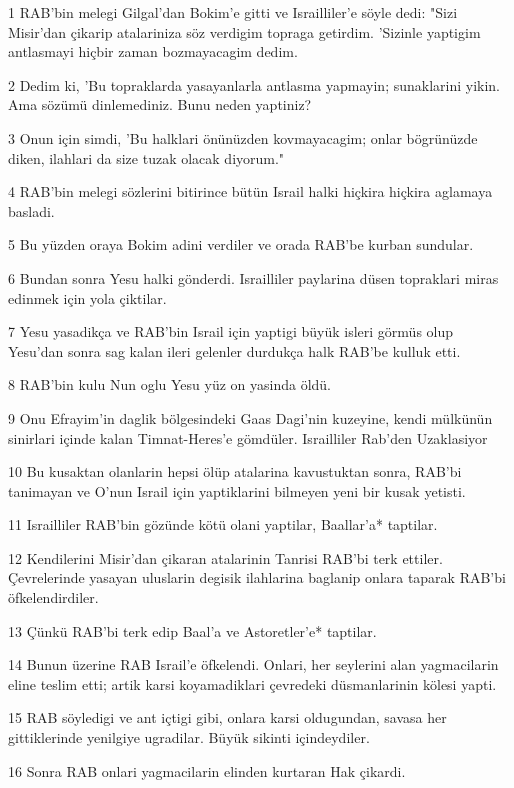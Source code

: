 \par 1 RAB'bin melegi Gilgal'dan Bokim'e gitti ve Israilliler'e söyle dedi: "Sizi Misir'dan çikarip atalariniza söz verdigim topraga getirdim. 'Sizinle yaptigim antlasmayi hiçbir zaman bozmayacagim dedim.
\par 2 Dedim ki, 'Bu topraklarda yasayanlarla antlasma yapmayin; sunaklarini yikin. Ama sözümü dinlemediniz. Bunu neden yaptiniz?
\par 3 Onun için simdi, 'Bu halklari önünüzden kovmayacagim; onlar bögrünüzde diken, ilahlari da size tuzak olacak diyorum."
\par 4 RAB'bin melegi sözlerini bitirince bütün Israil halki hiçkira hiçkira aglamaya basladi.
\par 5 Bu yüzden oraya Bokim adini verdiler ve orada RAB'be kurban sundular.
\par 6 Bundan sonra Yesu halki gönderdi. Israilliler paylarina düsen topraklari miras edinmek için yola çiktilar.
\par 7 Yesu yasadikça ve RAB'bin Israil için yaptigi büyük isleri görmüs olup Yesu'dan sonra sag kalan ileri gelenler durdukça halk RAB'be kulluk etti.
\par 8 RAB'bin kulu Nun oglu Yesu yüz on yasinda öldü.
\par 9 Onu Efrayim'in daglik bölgesindeki Gaas Dagi'nin kuzeyine, kendi mülkünün sinirlari içinde kalan Timnat-Heres'e gömdüler. Israilliler Rab'den Uzaklasiyor
\par 10 Bu kusaktan olanlarin hepsi ölüp atalarina kavustuktan sonra, RAB'bi tanimayan ve O'nun Israil için yaptiklarini bilmeyen yeni bir kusak yetisti.
\par 11 Israilliler RAB'bin gözünde kötü olani yaptilar, Baallar'a* taptilar.
\par 12 Kendilerini Misir'dan çikaran atalarinin Tanrisi RAB'bi terk ettiler. Çevrelerinde yasayan uluslarin degisik ilahlarina baglanip onlara taparak RAB'bi öfkelendirdiler.
\par 13 Çünkü RAB'bi terk edip Baal'a ve Astoretler'e* taptilar.
\par 14 Bunun üzerine RAB Israil'e öfkelendi. Onlari, her seylerini alan yagmacilarin eline teslim etti; artik karsi koyamadiklari çevredeki düsmanlarinin kölesi yapti.
\par 15 RAB söyledigi ve ant içtigi gibi, onlara karsi oldugundan, savasa her gittiklerinde yenilgiye ugradilar. Büyük sikinti içindeydiler.
\par 16 Sonra RAB onlari yagmacilarin elinden kurtaran Hak çikardi.
